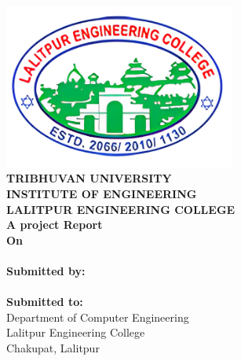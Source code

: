 \begin{center}

    \thispagestyle{empty}

    \includegraphics[width= 3in ]{img/leclogo21.png} \\
    \vspace{0.05 in}
    {\fontsize{12 pt}{12} \selectfont\textbf{TRIBHUVAN UNIVERSITY} \\
        \textbf{INSTITUTE OF ENGINEERING} \\
        \textbf{LALITPUR ENGINEERING COLLEGE}} \\

    \vspace{0.5 in}
    \textbf{A project Report}\\
    {\fontsize{12 pt}{12} \selectfont\textbf{On}\\}
    {\fontsize{12 pt}{12} \selectfont \textbf{\thetitle}}\\
    \vspace{1.1 in}
    \textbf{ Submitted by:}  \\
    {\theauthor} \\
    \vspace{0.8 in}
    \textbf{ Submitted to:}  \\
    Department of Computer Engineering \\
    Lalitpur Engineering College \\
    Chakupat, Lalitpur \\
    \vspace{0.7 in}
    \thedate
\end{center}